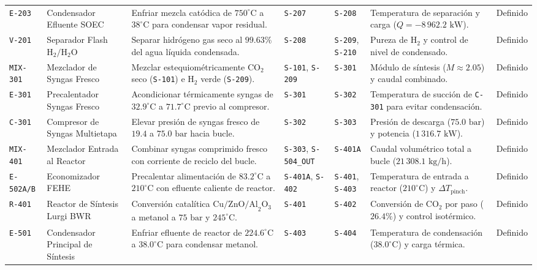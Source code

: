 \documentclass[10pt,letterpaper]{article}
\begin{document}
\begin{landscape}
\begin{xltabular}{\linewidth}{l >{\raggedright\arraybackslash}p{3.2cm} >{\raggedright\arraybackslash}X >{\centering\arraybackslash}p{2.0cm} >{\centering\arraybackslash}p{2.2cm} >{\raggedright\arraybackslash}p{4.5cm} c}
\texttt{E-203} & Condensador Efluente SOEC & Enfriar mezcla catódica de $750^\circ\text{C}$ a $38^\circ\text{C}$ para condensar vapor residual. & \texttt{S-207} & \texttt{S-208} & Temperatura de separación y carga ($Q=-8\,962.2\text{ kW}$). & Definido \\
\texttt{V-201} & Separador Flash $\text{H}_2/\text{H}_2\text{O}$ & Separar hidrógeno gas seco al $99.63\%$ del agua líquida condensada. & \texttt{S-208} & \texttt{S-209}, \texttt{S-210} & Pureza de $\text{H}_2$ y control de nivel de condensado. & Definido \\
\texttt{MIX-301} & Mezclador de Syngas Fresco & Mezclar estequiométricamente $\text{CO}_2$ seco (\texttt{S-101}) e $\text{H}_2$ verde (\texttt{S-209}). & \texttt{S-101}, \texttt{S-209} & \texttt{S-301} & Módulo de síntesis ($M \approx 2.05$) y caudal combinado. & Definido \\
\texttt{E-301} & Precalentador Syngas Fresco & Acondicionar térmicamente syngas de $32.9^\circ\text{C}$ a $71.7^\circ\text{C}$ previo al compresor. & \texttt{S-301} & \texttt{S-302} & Temperatura de succión de \texttt{C-301} para evitar condensación. & Definido \\
\texttt{C-301} & Compresor de Syngas Multietapa & Elevar presión de syngas fresco de $19.4$ a $75.0\text{ bar}$ hacia bucle. & \texttt{S-302} & \texttt{S-303} & Presión de descarga ($75.0\text{ bar}$) y potencia ($1\,316.7\text{ kW}$). & Definido \\
\texttt{MIX-401} & Mezclador Entrada al Reactor & Combinar syngas comprimido fresco con corriente de reciclo del bucle. & \texttt{S-303}, \texttt{S-504\_OUT} & \texttt{S-401A} & Caudal volumétrico total a bucle ($21\,308.1\text{ kg/h}$). & Definido \\
\texttt{E-502A/B} & Economizador FEHE & Precalentar alimentación de $83.2^\circ\text{C}$ a $210^\circ\text{C}$ con efluente caliente de reactor. & \texttt{S-401A}, \texttt{S-402} & \texttt{S-401}, \texttt{S-403} & Temperatura de entrada a reactor ($210^\circ\text{C}$) y $\Delta T_{\text{pinch}}$. & Definido \\
\texttt{R-401} & Reactor de Síntesis Lurgi BWR & Conversión catalítica $\text{Cu/ZnO/Al}_2\text{O}_3$ a metanol a $75\text{ bar}$ y $245^\circ\text{C}$. & \texttt{S-401} & \texttt{S-402} & Conversión de $\text{CO}_2$ por paso ($26.4\%$) y control isotérmico. & Definido \\
\texttt{E-501} & Condensador Principal de Síntesis & Enfriar efluente de reactor de $224.6^\circ\text{C}$ a $38.0^\circ\text{C}$ para condensar metanol. & \texttt{S-403} & \texttt{S-404} & Temperatura de condensación ($38.0^\circ\text{C}$) y carga térmica. & Definido \\

\end{xltabular}
\end{landscape}
\end{document}
